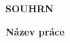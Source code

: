 \large
\noindent
\textbf{SOUHRN}

\vspace{5mm}
\noindent
\normalsize
\textbf{Název práce}

\vspace{5mm}

\begingroup
\fontsize{12}{11.5}\selectfont
\noindent

\lipsum[1-3]

\endgroup
